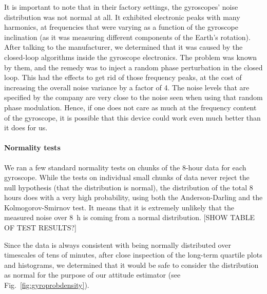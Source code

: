 It is important to note that in their factory settings, the gyroscopes' noise distribution was not normal at all. It exhibited electronic peaks with many harmonics, at frequencies that were varying as a function of the gyroscope inclination (as it was measuring different components of the Earth's rotation). After talking to the manufacturer, we determined that it was caused by the closed-loop algorithms inside the gyroscope electronics. The problem was known by them, and the remedy was to inject a random phase perturbation in the closed loop. This had the effects to get rid of those frequency peaks, at the cost of increasing the overall noise variance by a factor of 4. The noise levels that are specified by the company are very close to the noise seen when using that random phase modulation. Hence, if one does not care as much at the frequency content of the gyroscope, it is possible that this device could work even much better than it does for us.



\paragraph{Normality tests}

We ran a few standard normality tests on chunks of the 8-hour data for each gyroscope. While the tests on individual small chunks of data never reject the null hypothesis (that the distribution is normal), the distribution of the total 8 hours does with a very high probability, using both the Anderson-Darling and the Kolmogorov-Smirnov test. It means that it is extremely unlikely that the measured noise over \SI{8}{\hour} is coming from a normal distribution. [SHOW TABLE OF TEST RESULTS?]

Since the data is always consistent with being normally distributed over timescales of tens of minutes, after close inspection of the long-term quartile plots and histograms, we determined that it would be safe to consider the distribution as normal for the purpose of our attitude estimator (see Fig.~\ref{fig:gyroprobdensity}). 

